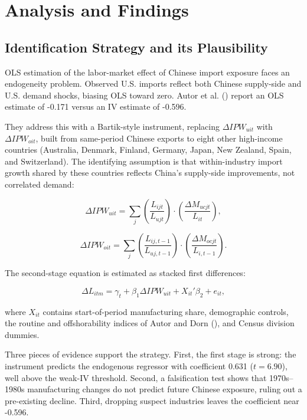 \documentclass[
  11pt,
]{article}
\begin{document}
\section{Analysis and Findings}\label{analysis-and-findings}

\subsection{Identification Strategy and its
Plausibility}\label{identification-strategy-and-its-plausibility}

OLS estimation of the labor-market effect of Chinese import exposure
faces an endogeneity problem. Observed U.S. imports reflect both Chinese
supply-side and U.S. demand shocks, biasing OLS toward zero. Autor et
al. () report an OLS estimate of
-0.171 versus an IV estimate of -0.596.

They address this with a Bartik-style instrument, replacing
\(\Delta IPW_{uit}\) with \(\Delta IPW_{oit}\), built from same-period
Chinese exports to eight other high-income countries (Australia,
Denmark, Finland, Germany, Japan, New Zealand, Spain, and Switzerland).
The identifying assumption is that within-industry import growth shared
by these countries reflects China's supply-side improvements, not
correlated demand:

\[
\Delta IPW_{uit}=\sum_j \left(\frac{L_{ijt}}{L_{ujt}}\right)\cdot \left(\frac{\Delta M_{ucjt}}{L_{it}}\right),
\]

\[
\Delta IPW_{oit}=\sum_j \left(\frac{L_{ij,t-1}}{L_{uj,t-1}}\right)\cdot \left(\frac{\Delta M_{ocjt}}{L_{i,t-1}}\right).
\]

The second-stage equation is estimated as stacked first differences:

\[
\Delta L_{itm}=\gamma_t+\beta_1\Delta IPW_{uit}+X_{it}'\beta_2+e_{it},
\]

where \(X_{it}\) contains start-of-period manufacturing share,
demographic controls, the routine and offshorability indices of Autor
and Dorn (), and Census division
dummies.

Three pieces of evidence support the strategy. First, the first stage is
strong: the instrument predicts the endogenous regressor with
coefficient 0.631 (\(t=6.90\)), well above the weak-IV threshold.
Second, a falsification test shows that 1970s--1980s manufacturing
changes do not predict future Chinese exposure, ruling out a
pre-existing decline. Third, dropping suspect industries leaves the
coefficient near -0.596.
\end{document}
